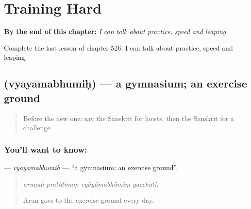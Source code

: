 
\chapter{Training Hard}
\label{ch:sa-training-hard}

\begin{chapteropening}
\textbf{By the end of this chapter:} \emph{I can talk about practice, speed and leaping.}

Complete the last lesson of chapter 526: I can talk about practice, speed and leaping.
\end{chapteropening}

\section[\texorpdfstring{\sk{व्यायामभूमिः} (vyāyāmabhūmiḥ)}{व्यायामभूमिः (vyāyāmabhūmiḥ)}]{ (vyāyāmabhūmiḥ) — a gymnasium; an exercise ground}

\label{lesson:SA-C526-vyayamabhumih}



\begin{quote}
Before the new one: say the Sanskrit for hoists, then the Sanskrit for a challenge.
\end{quote}

\subsection*{You'll want to know: }
\textbf{} — \emph{vyāyāmabhūmiḥ} — \textquotedblleft{}a gymnasium; an exercise ground\textquotedblright{}.

\begin{quote}
   
\end{quote}

\begin{quote}
\emph{aruṇaḥ pratidinaṃ vyāyāmabhūmiṃ gacchati.}
\end{quote}

\begin{quote}
Arun goes to the exercise ground every day.
\end{quote}

